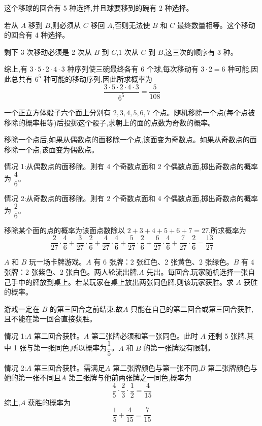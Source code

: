 \begin{questions}
\begin{solution}
        这个移球的回合有 5 种选择,并且球要移到的碗有 2 种选择。

        若从 $A$ 移到 $B$,则必须从 $C$ 移回 $A$,否则无法使 $B$ 和 $C$ 最终数量相等。这个移动的回合有 4 种选择。

        剩下 3 次移动必须是 2 次从 $B$ 到 $C$,1 次从 $C$ 到 $B$,这三次的顺序有 3 种。

        综上,有 $3 \cdot 5 \cdot 2 \cdot 4 \cdot 3$ 种序列使三碗最终各有 6 个球,每次移动有 $3 \cdot 2 = 6$ 种可能,因此总共有 $6^5$ 种可能的移动序列,因此所求概率为
        \[
        \frac{3 \cdot 5 \cdot 2 \cdot 4 \cdot 3}{6^5} = \frac{5}{108}
        \]
    \end{solution}

    \question 一个正立方体骰子六个面上分别有 $2,3,4,5,6,7$ 个点。随机移除一个点(每个点被移除的概率相等)后投掷这个骰子,求朝上的面的点数为奇数的概率。
    \begin{solution}
        移除一个点后,如果从偶数点的面移除一个点,该面变为奇数点。如果从奇数点的面移除一个点,该面变为偶数点。

        情况 1:从偶数点的面移除。则有 4 个奇数点面和 2 个偶数点面,掷出奇数点的概率为 $\dfrac{4}{6}$。

        情况 2:从奇数点的面移除。则有 2 个奇数点面和 4 个偶数点面,掷出奇数点的概率为 $\dfrac{2}{6}$。

        移除某个面的点的概率为该面点数除以 $2+3+4+5+6+7=27$,所求概率为
        \[
        \frac{2}{27}\cdot \frac{4}{6} + \frac{3}{27}\cdot \frac{2}{6} + \frac{4}{27}\cdot \frac{4}{6} + \frac{5}{27}\cdot \frac{2}{6} + \frac{6}{27}\cdot \frac{4}{6} + \frac{7}{27}\cdot \frac{2}{6} = \frac{13}{27}
        \]
    \end{solution}

    \question $A$ 和 $B$ 玩一场卡牌游戏。$A$ 有 6 张牌：2 张红色、2 张黄色、2 张绿色。$B$ 有 4 张牌：2 张紫色、2 张白色。两人轮流出牌,$A$ 先出。每回合,玩家随机选择一张自己手中的牌放到桌上。若某玩家在桌上放出两张同色牌,则该玩家获胜。求 $A$ 获胜的概率。
    \begin{solution}
        游戏一定在 $B$ 的第三回合之前结束,故$A$ 只能在自己的第二回合或第三回合获胜,且不能在第一回合直接获胜。

        情况 1:$A$ 第二回合获胜。$A$ 第二张牌必须和第一张同色。此时 $A$ 还剩 5 张牌,其中 1 张与第一张同色,所以概率为$\dfrac{1}{5}$。$A$ 和 $B$ 的第一张牌没有限制。

        情况 2:$A$ 第三回合获胜。需满足$A$ 第二张牌颜色与第一张不同,$B$ 第二张牌颜色与她的第一张不同且$A$ 第三张牌与他前两张牌之一同色,概率为
        \[
        \frac{4}{5} \cdot \frac{2}{3} \cdot \frac{1}{2} = \frac{4}{15}
        \]
        综上,$A$ 获胜的概率为
        \[
        \frac{1}{5} + \frac{4}{15} = \frac{7}{15}
        \]
    \end{solution}


\end{questions}
